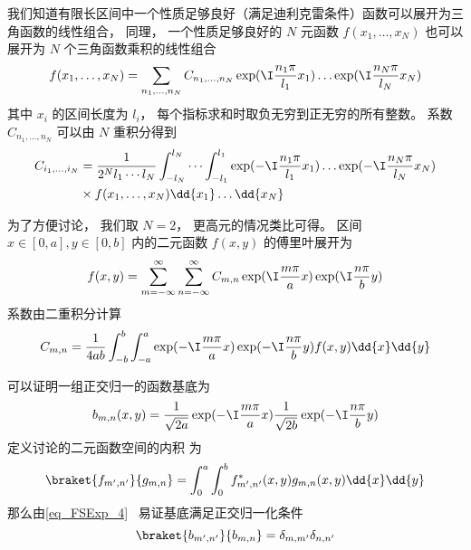 

我们知道有限长区间中一个性质足够良好（满足迪利克雷条件）函数可以展开为三角函数的线性组合， 同理， 一个性质足够良好的 $N$ 元函数 $f(x_1, \dots, x_N)$ 也可以展开为 $N$ 个三角函数乘积的线性组合
\begin{equation}
f(x_1, \dots, x_N) = \sum_{n_1,\dots, n_N} C_{n_1,\dots, n_N} \exp(\I \frac{n_1\pi}{l_1} x_1) \dots \exp(\I \frac{n_N \pi}{l_N} x_N)
\end{equation}
其中 $x_i$ 的区间长度为 $l_i$， 每个指标求和时取负无穷到正无穷的所有整数。 系数 $C_{n_1,\dots, n_N}$ 可以由 $N$ 重积分得到
\begin{equation}
\begin{aligned}
C_{i_1,\dots, i_N} &= \frac{1}{2^Nl_1\cdots l_N}\int_{-l_N}^{l_N}\cdots\int_{-l_1}^{l_1} \exp(-\I \frac{n_1 \pi}{l_1} x_1) \dots \exp(-\I \frac{n_N \pi}{l_N} x_N)\\
 & \times f(x_1, \dots, x_N) \dd{x_1}\dots\dd{x_N}
\end{aligned}
\end{equation}

为了方便讨论， 我们取 $N = 2$， 更高元的情况类比可得。 区间 $x\in [0, a], y\in [0, b]$ 内的二元函数 $f(x, y)$ 的傅里叶展开为
\begin{equation}
f(x, y) = \sum_{m = -\infty}^\infty \sum_{n = -\infty}^\infty C_{m, n} \exp(\I \frac{m \pi}{a} x) \exp(\I \frac{n \pi}{b} y)
\end{equation}
系数由二重积分计算
\begin{equation}
C_{m, n} = \frac{1}{4ab}\int_{-b}^b\int_{-a}^a \exp(-\I \frac{m \pi}{a} x) \exp(-\I \frac{n \pi}{b} y) f(x, y) \dd{x} \dd{y}
\end{equation}

可以证明一组正交归一的函数基底为
\begin{equation}
b_{m,n}(x, y) = \frac{1}{\sqrt{2a}}\exp(-\I \frac{m \pi}{a} x) \frac{1}{\sqrt{2b}}\exp(-\I \frac{n \pi}{b} y)
\end{equation}
定义讨论的二元函数空间的内积 为
\begin{equation}
\braket{f_{m',n'}}{g_{m,n}} = \int_0^a\int_0^b f^*_{m',n'}(x, y) g_{m,n}(x, y) \dd{x}\dd{y}
\end{equation}
那么由\autoref{eq_FSExp_4}~ 易证基底满足正交归一化条件
\begin{equation}
\braket{b_{m',n'}}{b_{m,n}} = \delta_{m,m'} \delta_{n,n'}
\end{equation}

